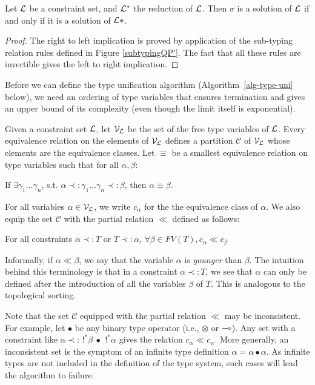 \begin{lemma} \label{reductionQP'}
	Let $\mathcal{L}$ be a constraint set, and $\mathcal{L}^*$ the reduction of $\mathcal{L}$. Then $\sigma$ is a solution of $\mathcal{L}$ if and only if it is
	a solution of $\mathcal{L}*$.
	
	\begin{proof}
		The right to left implication is proved by application of the sub-typing relation rules defined in Figure \ref{subtypingQP'}.
		The fact that all these rules are invertible gives the left to right implication.
	\end{proof}
\end{lemma}

Before we can define the type unification algorithm (Algorithm~\ref{alg-type-uni} below), we need an ordering of type variables that ensures termination and gives an upper
bound of its complexity (even though the limit itself is exponential).

\begin{defn} Given a constraint set $\mathcal{L}$, let $\mathcal{V}_{\mathcal{L}}$ be the set of the free type variables of $\mathcal{L}$. Every equivalence relation
	on the elements of $\mathcal{V}_{\mathcal{L}}$ defines a partition $\mathcal{C}$ of $\mathcal{V}_{\mathcal{L}}$ whose elements are the equivalence classes.
	Let $\equiv$ be a smallest equivalence relation on type variables such that for all $\alpha,\beta$:
		\begin{center}
			If $\exists \gamma_1 \dots \gamma_n$, s.t. $\alpha \prec: \gamma_1 \dots
				\gamma_n \prec: \beta$, then $\alpha \equiv \beta$.
		\end{center}
	For all variables $\alpha \in \mathcal{V}_{\mathcal{L}}$, we write $c_\alpha$ for the the equivalence class of $\alpha$.
	We also equip the set $\mathcal{C}$ with the partial relation $\ll$ defined as follows:
  	\begin{center}
  	  For all constraints $\alpha \prec: T$ or $T \prec: \alpha$, $\forall \beta \in FV(T), c_\alpha \ll c_\beta$
  	\end{center}
\end{defn}

Informally, if $\alpha\ll\beta$, we say that the variable $\alpha$ is
{\em younger} than $\beta$. The intuition behind this terminology is
that in a constraint $\alpha \prec: T$,
we see that $\alpha$ can only be defined after the introduction of all the variables $\beta$ of $T$. This is analogous to the topological sorting.

Note that the set $\mathcal{C}$ equipped with the partial relation
$\ll$ may be inconsistent. For example, let $\bullet$ be any binary type
operator (i.e., $\otimes$ or $\multimap$). Any set with
a constraint like $\alpha \prec: \,!^*\beta ~\bullet~ \,!^*\alpha$ gives the relation $c_\alpha \ll c_\alpha$. More generally,
an inconsistent set is the symptom of an infinite type definition $\alpha = \alpha \bullet \alpha$. As infinite types are not included
in the definition of the type system, such cases will lead the algorithm to failure.
  
